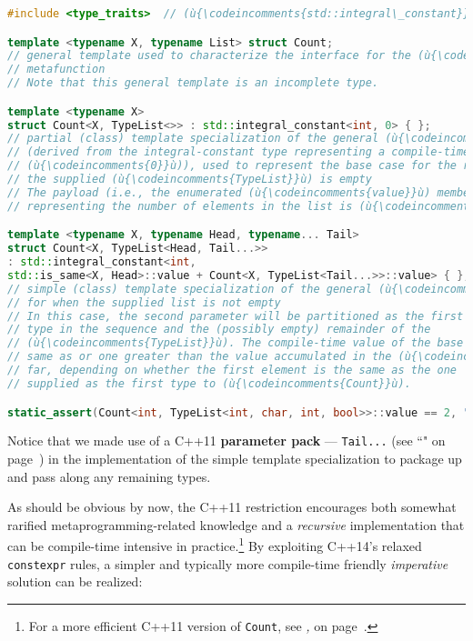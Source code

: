 \begin{lstlisting}[language=C++,label={relaxedconstexpr-countcode}]
#include <type_traits>  // (ù{\codeincomments{std::integral\_constant}}ù), (ù{\codeincomments{std::is\_same}}ù)

template <typename X, typename List> struct Count;
// general template used to characterize the interface for the (ù{\codeincomments{Count}}ù)
// metafunction
// Note that this general template is an incomplete type.

template <typename X>
struct Count<X, TypeList<>> : std::integral_constant<int, 0> { };
// partial (class) template specialization of the general (ù{\codeincomments{Count}}ù) template
// (derived from the integral-constant type representing a compile-time
// (ù{\codeincomments{0}}ù)), used to represent the base case for the recursion --- i.e., when
// the supplied (ù{\codeincomments{TypeList}}ù) is empty
// The payload (i.e., the enumerated (ù{\codeincomments{value}}ù) member of the base class)
// representing the number of elements in the list is (ù{\codeincomments{0}}ù).

template <typename X, typename Head, typename... Tail>
struct Count<X, TypeList<Head, Tail...>>
: std::integral_constant<int,
std::is_same<X, Head>::value + Count<X, TypeList<Tail...>>::value> { };
// simple (class) template specialization of the general (ù{\codeincomments{count}}ù) template
// for when the supplied list is not empty
// In this case, the second parameter will be partitioned as the first
// type in the sequence and the (possibly empty) remainder of the
// (ù{\codeincomments{TypeList}}ù). The compile-time value of the base class will be either the
// same as or one greater than the value accumulated in the (ù{\codeincomments{TypeList}}ù) so
// far, depending on whether the first element is the same as the one
// supplied as the first type to (ù{\codeincomments{Count}}ù).

static_assert(Count<int, TypeList<int, char, int, bool>>::value == 2, "");
\end{lstlisting}

\noindent Notice that we made use of a C++11 \textbf{parameter pack} ---
\texttt{Tail...} (see ``" on page~\pageref{variadictemplate}) in the
implementation of the simple template specialization to package up and
pass along any remaining types.

As should be obvious by now, the C++11 restriction encourages both
somewhat rarified metaprogramming-related knowledge and a
\emph{recursive} implementation that can be compile-time intensive in
practice.{\cprotect\footnote{For a more efficient C++11 version of
\texttt{Count}, see \textit{, } on page~\pageref{constexpr-typelist-count-algorithm}.}} By exploiting C++14's relaxed
\texttt{constexpr} rules, a simpler and typically more compile-time
friendly \emph{imperative} solution can be realized:

